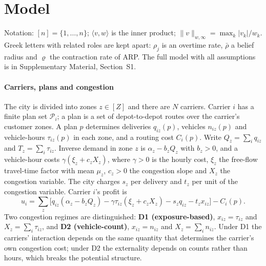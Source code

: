 \documentclass[preprint,11pt]{elsarticle}
\theoremstyle{definition}
\theoremstyle{remark}
\newcommand{\cP}{\mathcal{P}}
\newcommand{\ip}[2]{\langle #1,#2\rangle}
\newcommand{\SM}[1]{Supplementary Material, Section~#1}
\begin{document}
\section{Model}\label{sec:model}

Notation: $[n]=\{1,\dots,n\}$; $\ip{v}{w}$ is the inner product; $\|v\|_{w,\infty}=\max_k|v_k|/w_k$. Greek letters with related roles are kept apart: $\rho_j$ is an overtime rate, $\bar\rho$ a belief radius and $\varrho$ the contraction rate of ARP. The full model with all assumptions is in \SM{S1}.

\paragraph{Carriers, plans and congestion} The city is divided into zones $z\in[Z]$ and there are $N$ carriers. Carrier $i$ has a finite plan set $\cP_i$; a plan is a set of depot-to-depot routes over the carrier's customer zones. A plan $p$ determines deliveries $q_{iz}(p)$, vehicles $n_{iz}(p)$ and vehicle-hours $\tau_{iz}(p)$ in each zone, and a routing cost $C_i(p)$. Write $Q_z=\sum_iq_{iz}$ and $T_z=\sum_i\tau_{iz}$. Inverse demand in zone $z$ is $\alpha_z-b_zQ_z$ with $b_z>0$, and a vehicle-hour costs $\gamma(\xi_z+c_zX_z)$, where $\gamma>0$ is the hourly cost, $\xi_z$ the free-flow travel-time factor with mean $\mu_z$, $c_z>0$ the congestion slope and $X_z$ the congestion variable. The city charges $s_z$ per delivery and $t_z$ per unit of the congestion variable. Carrier $i$'s profit is
\begin{equation}\label{eq:profit}
u_i=\sum_z\big[q_{iz}(\alpha_z-b_zQ_z)-\gamma\tau_{iz}(\xi_z+c_zX_z)-s_zq_{iz}-t_zx_{iz}\big]-C_i(p).
\end{equation}
Two congestion regimes are distinguished: \textbf{D1 (exposure-based)}, $x_{iz}=\tau_{iz}$ and $X_z=\sum_i\tau_{iz}$, and \textbf{D2 (vehicle-count)}, $x_{iz}=n_{iz}$ and $X_z=\sum_in_{iz}$. Under D1 the carriers' interaction depends on the same quantity that determines the carrier's own congestion cost; under D2 the externality depends on counts rather than hours, which breaks the potential structure.
\end{document}

